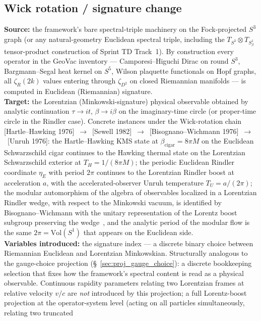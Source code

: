 \documentclass[11pt]{article}
\begin{document}
\subsection{Wick rotation / signature change}
\label{sec:proj_wick_rotation}
\textbf{Source:} the framework's bare spectral-triple machinery on
the Fock-projected $S^3$ graph (or any natural-geometry Euclidean
spectral triple, including the $T_{S^3} \otimes T_{S^1_\beta}$
tensor-product construction of Sprint TD Track~1).  By construction
every operator in the GeoVac inventory ---
Camporesi--Higuchi Dirac on round $S^3$, Bargmann--Segal heat
kernel on $S^5$, Wilson plaquette functionals on Hopf graphs, all
$\zeta_R(2k)$ values entering through $\zeta_{D^2}$ on closed
Riemannian manifolds --- is computed in Euclidean (Riemannian)
signature.\\
\textbf{Target:} the Lorentzian (Minkowski-signature) physical
observable obtained by analytic continuation
$\tau \to i t$, $\beta \to i \beta$ on the imaginary-time circle
(or proper-time circle in the Rindler case).  Concrete instances
under the Wick-rotation chain
[Hartle--Hawking 1976]~$\to$~[Sewell 1982]~$\to$~[Bisognano--Wichmann
1976]~$\to$~[Unruh 1976]:
the Hartle--Hawking KMS state at
$\beta_{\mathrm{cigar}} = 8\pi M$ on the Euclidean Schwarzschild
cigar continues to the Hawking thermal state on the Lorentzian
Schwarzschild exterior at $T_H = 1/(8\pi M)$; the periodic
Euclidean Rindler coordinate $\eta_E$ with period $2\pi$ continues
to the Lorentzian Rindler boost at acceleration $a$, with the
accelerated-observer Unruh temperature $T_U = a/(2\pi)$; the modular
automorphism of the algebra of observables localized in a Lorentzian
Rindler wedge, with respect to the Minkowski vacuum, is identified
by Bisognano--Wichmann with the unitary representation of the Lorentz
boost subgroup preserving the wedge~\cite{tener2025_bw_nonunitary},
and the analytic period of the
modular flow is the same $2\pi = \mathrm{Vol}(S^1)$ that appears on
the Euclidean side.\\
\textbf{Variables introduced:} the signature index --- a discrete
binary choice between Riemannian Euclidean and Lorentzian
Minkowskian.  Structurally analogous to the gauge-choice projection
(\S~\ref{sec:proj_gauge_choice}): a discrete bookkeeping selection
that fixes how the framework's spectral content is read as a physical
observable.  Continuous rapidity parameters relating two Lorentzian
frames at relative velocity $v/c$ are \emph{not} introduced by this
projection; a full Lorentz-boost projection at the operator-system
level (acting on all particles simultaneously, relating two truncated
\end{document}
